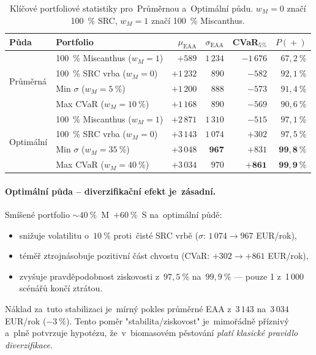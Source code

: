 \begin{table}[H]
\centering
\caption{Klíčové portfoliové statistiky pro~Průměrnou a~Optimální půdu.
\(w_M = 0\) značí 100~\% SRC, \(w_M = 1\) značí 100~\% Miscanthus.}
\label{tab:diverzifikace}
\renewcommand{\arraystretch}{1.15}
\small
\begin{tabular}{ll|rrrr}
\toprule
\textbf{Půda} & \textbf{Portfolio} & $\mu_{\mathrm{EAA}}$ & $\sigma_{\mathrm{EAA}}$ & CVaR$_{5\%}$ & $P(\!+\!)$ \\
\midrule
\multirow{4}{*}{Průměrná}
 & 100~\% Miscanthus ($w_M = 1$)         & $+589$    & $1\,234$ & $-1\,676$ & $67{,}2~\%$ \\
 & 100~\% SRC vrba ($w_M = 0$)           & $+1\,232$ & $890$    & $-582$    & $92{,}1~\%$ \\
 & Min $\sigma$ ($w_M = 5~\%$)           & $+1\,200$ & $888$    & $-573$    & $91{,}4~\%$ \\
 & Max CVaR ($w_M = 10~\%$)              & $+1\,168$ & $890$    & $-569$    & $90{,}6~\%$ \\
\midrule
\multirow{4}{*}{Optimální}
 & 100~\% Miscanthus ($w_M = 1$)         & $+2\,871$ & $1\,310$ & $-515$    & $97{,}1~\%$ \\
 & 100~\% SRC vrba ($w_M = 0$)           & $+3\,143$ & $1\,074$ & $+302$    & $97{,}5~\%$ \\
 & Min $\sigma$ ($w_M = 35~\%$)          & $+3\,048$ & $\mathbf{967}$ & $+831$ & $\mathbf{99{,}8~\%}$ \\
 & Max CVaR ($w_M = 40~\%$)              & $+3\,034$ & $970$    & $\mathbf{+861}$    & $\mathbf{99{,}9~\%}$ \\
\bottomrule
\end{tabular}
\end{table}

\paragraph{Optimální půda -- diverzifikační efekt je~zásadní.}
Smíšené portfolio $\sim 40~\%$~M~$+ 60~\%$~S na~optimální půdě:
\begin{itemize}
\item snižuje volatilitu o~$10~\%$ proti~čisté SRC vrbě
      ($\sigma$: $1\,074 \to 967$ EUR/rok),
\item téměř ztrojnásobuje pozitivní část chvostu (CVaR: $+302 \to +861$
      EUR/rok),
\item zvyšuje pravděpodobnost ziskovosti z~$97{,}5~\%$ na~$99{,}9~\%$ ---
      pouze 1 z~1\,000 scénářů končí ztrátou.
\end{itemize}
Náklad za~tuto stabilizaci je~mírný pokles průměrné EAA z~$3\,143$ na~$3\,034$
EUR/rok ($-3~\%$). Tento poměr "stabilita/ziskovost" je~mimořádně
příznivý a~plně potvrzuje hypotézu, že~v~biomasovém pěstování
\emph{platí klasické pravidlo diverzifikace}.

